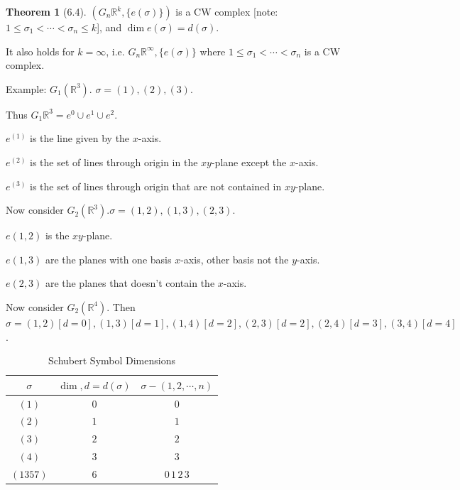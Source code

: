 \documentclass{article}
\theoremstyle{definition}
\newtheorem{theorem}{Theorem}
\begin{document}
    \begin{theorem}
        [6.4] \((G_n \mathbb{R}^k, \{ e(\sigma)\})\) is a CW complex [note: \(1 \leq \sigma_1 < \cdots < \sigma_n \leq k\)], and \(\dim e(\sigma) = d(\sigma)\).

        It also holds for \(k=\infty\), i.e. \(G_n \mathbb{R}^{\infty}, \{ e(\sigma) \}\) where \(1 \leq \sigma_1 < \cdots < \sigma_n\) is a CW complex.
    \end{theorem}

    Example: \(G_1(\mathbb{R}^3)\). \(\sigma = (1), (2), (3)\).

    Thus \(G_1 \mathbb{R}^3 = e^0 \cup e^1 \cup e^2\).

    \(e^{(1)}\) is the line given by the \(x\)-axis.

    \(e^{(2)}\) is the set of lines through origin in the \(xy\)-plane except the \(x\)-axis.

    \(e^{(3)}\) is the set of lines through origin that are not contained in \(xy\)-plane.

    Now consider \(G_2(\mathbb{R}^3). \sigma =(1,2),(1,3),(2,3)\).

    \(e(1,2)\) is the \(xy\)-plane.
    
    \(e(1,3)\) are the planes with one basis \(x\)-axis, other basis not the \(y\)-axis.

    \(e(2,3)\) are the planes that doesn't contain the \(x\)-axis.

    Now consider \(G_2(\mathbb{R}^4)\). Then \(\sigma = (1,2) [d=0],(1,3) [d=1],(1,4) [d=2], (2,3) [d=2], (2,4) [d=3], (3,4) [d=4]\).

    \begin{table}[H]
        \centering
        \begin{tabular}{c|c|c}
            \toprule
                \(\sigma\) & \(\dim, d = d(\sigma)\) & \(\sigma - (1,2,\cdots , n)\) \\
            \midrule
                \((1)\) & \(0\) & \(0\) \\
                \((2)\) & \(1\) & \(1\)  \\
                \((3)\) & \(2\) & \(2\) \\
                \((4)\) & \(3\) & \(3\) \\
                \((1357)\) & \(6\) & \(0\,1\,2\,3\)  \\
            \bottomrule
        \end{tabular}
        \caption{Schubert Symbol Dimensions}
    \end{table}
\end{document}
